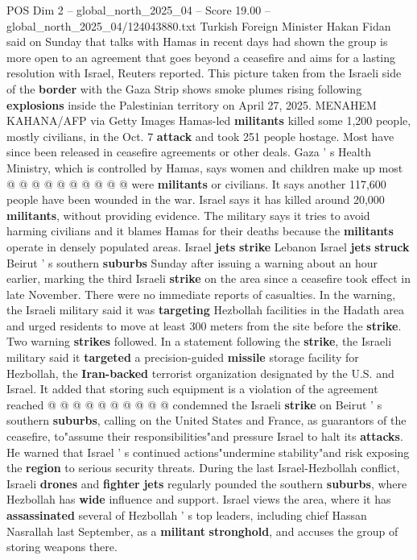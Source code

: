 \begin{textsample}{POS Dim 2 – global\_north\_2025\_04 – Score 19.00 – global\_north\_2025\_04/124043880.txt}
Turkish Foreign Minister Hakan Fidan said on Sunday that talks with Hamas in recent days had shown the group is more open to an agreement that goes beyond a ceasefire and aims for a lasting resolution with Israel, Reuters reported.
This picture taken from the Israeli side of the \textbf{border} with the Gaza Strip shows smoke plumes rising following \textbf{explosions} inside the Palestinian territory on April 27, 2025.
MENAHEM KAHANA/AFP via Getty Images Hamas-led \textbf{militants} killed some 1,200 people, mostly civilians, in the Oct. 7 \textbf{attack} and took 251 people hostage.
Most have since been released in ceasefire agreements or other deals.
Gaza ' s Health Ministry, which is controlled by Hamas, says women and children make up most @ @ @ @ @ @ @ @ @ @ were \textbf{militants} or civilians.
It says another 117,600 people have been wounded in the war.
Israel says it has killed around 20,000 \textbf{militants}, without providing evidence.
The military says it tries to avoid harming civilians and it blames Hamas for their deaths because the \textbf{militants} operate in densely populated areas.
Israel \textbf{jets} \textbf{strike} Lebanon Israel \textbf{jets} \textbf{struck} Beirut ' s southern \textbf{suburbs} Sunday after issuing a warning about an hour earlier, marking the third Israeli \textbf{strike} on the area since a ceasefire took effect in late November.
There were no immediate reports of casualties.
In the warning, the Israeli military said it was \textbf{targeting} Hezbollah facilities in the Hadath area and urged residents to move at least 300 meters from the site before the \textbf{strike}.
Two warning \textbf{strikes} followed.
In a statement following the \textbf{strike}, the Israeli military said it \textbf{targeted} a precision-guided \textbf{missile} storage facility for Hezbollah, the \textbf{Iran-backed} terrorist organization designated by the U.S. and Israel.
It added that storing such equipment is a violation of the agreement reached @ @ @ @ @ @ @ @ @ @ condemned the Israeli \textbf{strike} on Beirut ' s southern \textbf{suburbs}, calling on the United States and France, as guarantors of the ceasefire, to"assume their responsibilities"and pressure Israel to halt its \textbf{attacks}.
He warned that Israel ' s continued actions"undermine stability"and risk exposing the \textbf{region} to serious security threats.
During the last Israel-Hezbollah conflict, Israeli \textbf{drones} and \textbf{fighter} \textbf{jets} regularly pounded the southern \textbf{suburbs}, where Hezbollah has \textbf{wide} influence and support.
Israel views the area, where it has \textbf{assassinated} several of Hezbollah ' s top leaders, including chief Hassan Nasrallah last September, as a \textbf{militant} \textbf{stronghold}, and accuses the group of storing weapons there.

\end{textsample}
